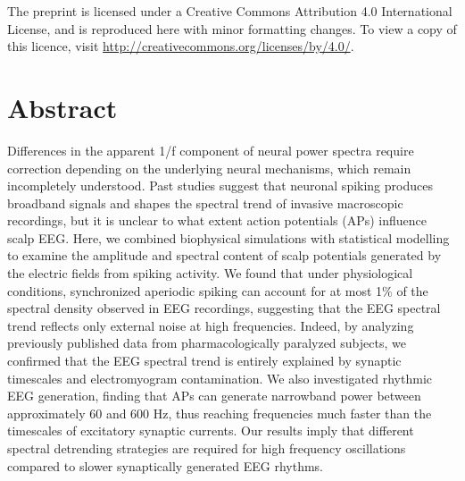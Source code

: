 \noindent
The preprint is licensed under a Creative Commons Attribution 4.0 International License, and is reproduced here with minor formatting changes. To view a copy of this licence, visit \url{http://creativecommons.org/licenses/by/4.0/}.

\newpage

\section{Abstract}
Differences in the apparent 1/f component of neural power spectra require correction depending on the underlying neural mechanisms, which remain incompletely understood. Past studies suggest that neuronal spiking produces broadband signals and shapes the spectral trend of invasive macroscopic recordings, but it is unclear to what extent action potentials (APs) influence scalp EEG. Here, we combined biophysical simulations with statistical modelling to examine the amplitude and spectral content of scalp potentials generated by the electric fields from spiking activity. We found that under physiological conditions, synchronized aperiodic spiking can account for at most 1\% of the spectral density observed in EEG recordings, suggesting that the EEG spectral trend reflects only external noise at high frequencies. Indeed, by analyzing previously published data from pharmacologically paralyzed subjects, we confirmed that the EEG spectral trend is entirely explained by synaptic timescales and electromyogram contamination. We also investigated rhythmic EEG generation, finding that APs can generate narrowband power between approximately 60 and 600 Hz, thus reaching frequencies much faster than the timescales of excitatory synaptic currents. Our results imply that different spectral detrending strategies are required for high frequency oscillations compared to slower synaptically generated EEG rhythms.


